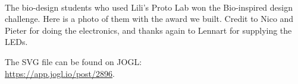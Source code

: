 \documentclass{report}
\begin{document}
\clearpage
\begin{figure}
    \centering
\end{figure}
\clearpage

 \\

The bio-design students who used Lili's Proto Lab won the Bio-inspired design challenge. Here is a photo of them with the award we built. Credit to Nico and Pieter for doing the electronics, and thanks again to Lennart for supplying the LEDs.

The SVG file can be found on JOGL:\\
\url{https://app.jogl.io/post/2896}.
\end{document}
